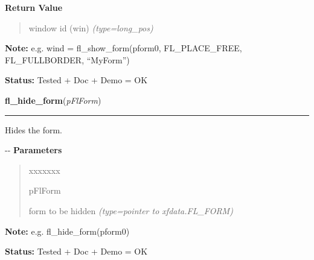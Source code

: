 \begin{boxedminipage}{\funcwidth}
\begin{quote}
      \end{quote}

      \textbf{Return Value}
    \vspace{-1ex}

      \begin{quote}

window id (win)
      {\it (type=long\_pos)}

      \end{quote}

\textbf{Note:} 
e.g. wind = fl\_show\_form(pform0, FL\_PLACE\_FREE, FL\_FULLBORDER,
``MyForm'')


\textbf{Status:} 
Tested + Doc + Demo = OK


    \end{boxedminipage}

    \label{xformslib:flbasic:fl_hide_form}

    \vspace{0.5ex}

\hspace{.8\funcindent}\begin{boxedminipage}{\funcwidth}

    \raggedright \textbf{fl\_hide\_form}(\textit{pFlForm})

    \vspace{-1.5ex}

    \rule{\textwidth}{0.5\fboxrule}
\setlength{\parskip}{2ex}

Hides the form.

-{}-
\setlength{\parskip}{1ex}
      \textbf{Parameters}
      \vspace{-1ex}

      \begin{quote}
        \begin{Ventry}{xxxxxxx}

          \item[pFlForm]


form to be hidden
            {\it (type=pointer to xfdata.FL\_FORM)}

        \end{Ventry}

      \end{quote}

\textbf{Note:} 
e.g. fl\_hide\_form(pform0)


\textbf{Status:} 
Tested + Doc + Demo = OK


    \end{boxedminipage}

